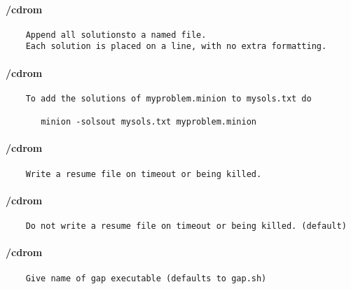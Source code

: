 \paragraph{/cdrom}
{\footnotesize
\begin{verbatim}
    Append all solutionsto a named file.
    Each solution is placed on a line, with no extra formatting.
\end{verbatim}
}
\paragraph{/cdrom}
{\footnotesize
\begin{verbatim}
    To add the solutions of myproblem.minion to mysols.txt do

       minion -solsout mysols.txt myproblem.minion
\end{verbatim}
}
\paragraph{/cdrom}
{\footnotesize
\begin{verbatim}
    Write a resume file on timeout or being killed.
\end{verbatim}
}
\paragraph{/cdrom}
{\footnotesize
\begin{verbatim}
    Do not write a resume file on timeout or being killed. (default)
\end{verbatim}
}
\paragraph{/cdrom}
{\footnotesize
\begin{verbatim}
    Give name of gap executable (defaults to gap.sh)
\end{verbatim}
}
